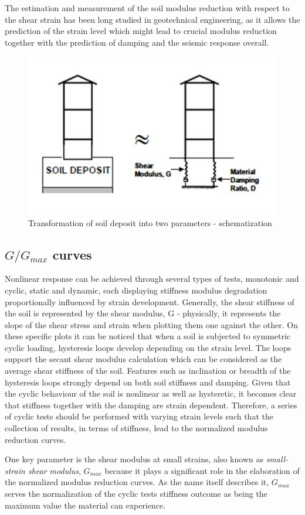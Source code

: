 \documentclass[12pt,a4paper]{report}
\begin{document}
The estimation and measurement of the soil modulus reduction with respect to the shear strain has been long studied in geotechnical engineering, as it allows the prediction of the strain level which might lead to crucial modulus reduction together with the prediction of damping and the seismic response overall. 

\begin{figure}[h!]
	\centering
	\includegraphics[width=0.6\linewidth]{"soildeposit"}
	\caption{Transformation of soil deposit into two parameters - schematization}
	\label{scheme2}
\end{figure}
\newpage
\subsection{${G/G_{max}}$ curves}
Nonlinear response can be achieved through several types of tests, monotonic and cyclic, static and dynamic, each displaying stiffness modulus degradation proportionally influenced by strain development. Generally, the shear stiffness of the soil is represented by the shear modulus, G - physically, it represents the slope of the shear stress and strain when plotting them one against the other. On these specific plots it can be noticed that when a soil is subjected to symmetric cyclic loading, hysteresis loops develop depending on the strain level. The loops support the secant shear modulus calculation which can be considered as the average shear stiffness of the soil. Features such as inclination or breadth of the hysteresis loops strongly depend on both soil stiffness and damping. Given that the cyclic behaviour of the soil is nonlinear as well as hysteretic, it becomes clear that stiffness together with the damping are strain dependent. Therefore, a series of cyclic tests should be performed with varying strain levels such that the collection of results, in terms of stiffness, lead to the normalized modulus reduction curves.

One key parameter is the shear modulus at small strains, also known as \textit{small-strain shear modulus}, $G_{max}$ because it plays a significant role in the elaboration of the normalized modulus reduction curves. As the name itself describes it, $G_{max}$ serves the normalization of the cyclic tests stiffness outcome as being the maximum value the material can experience. 
\end{document}
